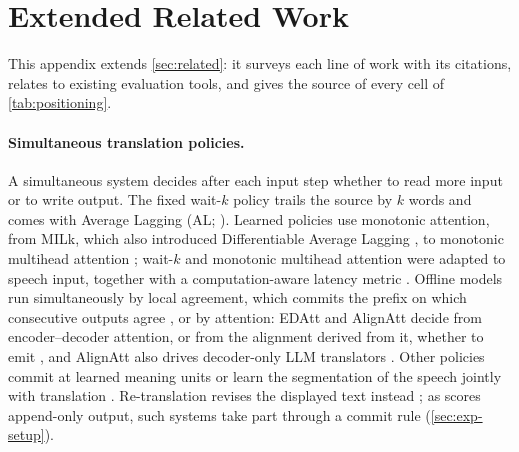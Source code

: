 \section{Extended Related Work}\label{app:related}

This appendix extends \cref{sec:related}: it surveys each line of work with its citations, relates \scorer to existing evaluation tools, and gives the source of every cell of \cref{tab:positioning}.

\paragraph{Simultaneous translation policies.}
A simultaneous system decides after each input step whether to read more input or to write output. The fixed wait-$k$ policy trails the source by $k$ words and comes with Average Lagging (AL; \citealp{ma2019stacl}). Learned policies use monotonic attention, from MILk, which also introduced Differentiable Average Lagging \citep{arivazhagan2019monotonic}, to monotonic multihead attention \citep{ma2020monotonic}; wait-$k$ and monotonic multihead attention were adapted to speech input, together with a computation-aware latency metric \citep{ma2020simulmt}. Offline models run simultaneously by local agreement, which commits the prefix on which consecutive outputs agree \citep{liu2020lowlatency,polak2022cuni,machacek2023turning}, or by attention: EDAtt and AlignAtt decide from encoder--decoder attention, or from the alignment derived from it, whether to emit \citep{papi2023attention,papi2023alignatt}, and AlignAtt also drives decoder-only LLM translators \citep{fuxa2026alignatt4llm}. Other policies commit at learned meaning units \citep{zhang2020learning} or learn the segmentation of the speech jointly with translation \citep{zhang2023endtoend}. Re-translation revises the displayed text instead \citep{arivazhagan2020retranslation}; as \task scores append-only output, such systems take part through a commit rule (\cref{sec:exp-setup}).


